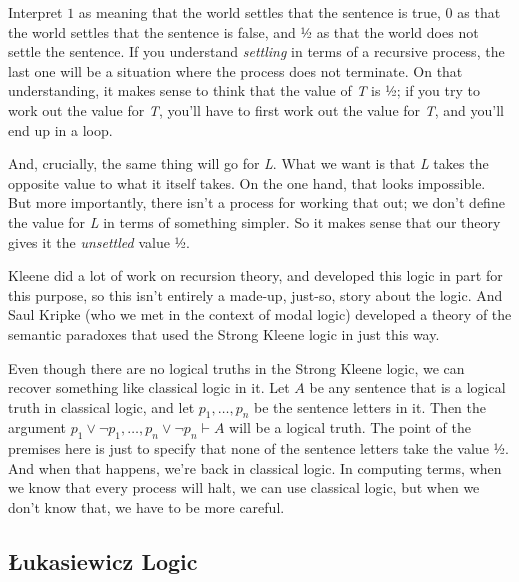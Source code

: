 \documentclass[
]{article}
\begin{document}
Interpret \(1\) as meaning that the world settles that the sentence is
true, \(0\) as that the world settles that the sentence is false, and ½
as that the world does not settle the sentence. If you understand
\emph{settling} in terms of a recursive process, the last one will be a
situation where the process does not terminate. On that understanding,
it makes sense to think that the value of \emph{T} is ½; if you try to
work out the value for \emph{T}, you'll have to first work out the value
for \emph{T}, and you'll end up in a loop.

And, crucially, the same thing will go for \emph{L}. What we want is
that \emph{L} takes the opposite value to what it itself takes. On the
one hand, that looks impossible. But more importantly, there isn't a
process for working that out; we don't define the value for \emph{L} in
terms of something simpler. So it makes sense that our theory gives it
the \emph{unsettled} value ½.

Kleene did a lot of work on recursion theory, and developed this logic
in part for this purpose, so this isn't entirely a made-up, just-so,
story about the logic. And Saul Kripke (who we met in the context of
modal logic) developed a theory of the semantic paradoxes that used the
Strong Kleene logic in just this way.

Even though there are no logical truths in the Strong Kleene logic, we
can recover something like classical logic in it. Let \(A\) be any
sentence that is a logical truth in classical logic, and let
\(p_1, \dots, p_n\) be the sentence letters in it. Then the argument
\(p_1 \vee \neg p_1, \dots, p_n \vee \neg p_n \vdash A\) will be a
logical truth. The point of the premises here is just to specify that
none of the sentence letters take the value ½. And when that happens,
we're back in classical logic. In computing terms, when we know that
every process will halt, we can use classical logic, but when we don't
know that, we have to be more careful.

\hypertarget{ux142ukasiewicz-logic}{%
\subsection{Łukasiewicz Logic}\label{ux142ukasiewicz-logic}}
\end{document}
